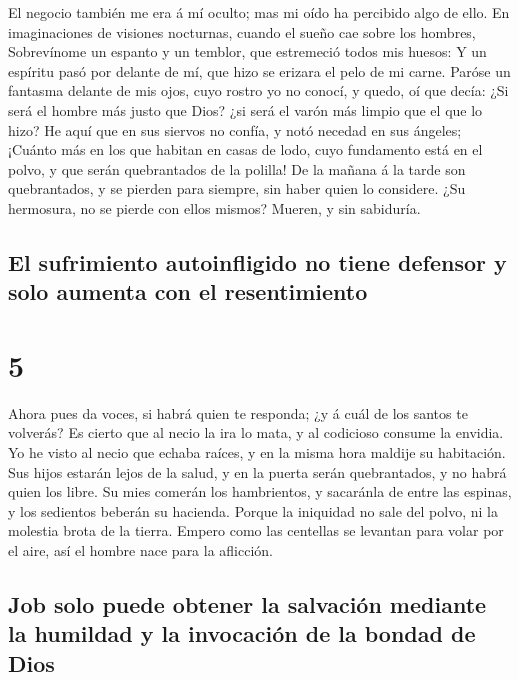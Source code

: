  El negocio también me era á mí oculto; mas mi oído ha
percibido algo de ello.  En imaginaciones de visiones
nocturnas, cuando el sueño cae sobre los hombres, 
Sobrevínome un espanto y un temblor, que estremeció todos mis huesos:
 Y un espíritu pasó por delante de mí, que hizo se
erizara el pelo de mi carne.  Paróse un fantasma delante
de mis ojos, cuyo rostro yo no conocí, y quedo, oí que decía:
 ¿Si será el hombre más justo que Dios? ¿si será el varón
más limpio que el que lo hizo?  He aquí que en sus
siervos no confía, y notó necedad en sus ángeles; 
¡Cuánto más en los que habitan en casas de lodo, cuyo fundamento está en
el polvo, y que serán quebrantados de la polilla!  De la
mañana á la tarde son quebrantados, y se pierden para siempre, sin haber
quien lo considere.  ¿Su hermosura, no se pierde con
ellos mismos? Mueren, y sin sabiduría.

\hypertarget{el-sufrimiento-autoinfligido-no-tiene-defensor-y-solo-aumenta-con-el-resentimiento}{%
\subsection{El sufrimiento autoinfligido no tiene defensor y solo
aumenta con el
resentimiento}\label{el-sufrimiento-autoinfligido-no-tiene-defensor-y-solo-aumenta-con-el-resentimiento}}

\hypertarget{section-18-5}{%
\section{5}\label{section-18-5}}

 Ahora pues da voces, si habrá quien te responda; ¿y á
cuál de los santos te volverás?  Es cierto que al necio la
ira lo mata, y al codicioso consume la envidia.  Yo he
visto al necio que echaba raíces, y en la misma hora maldije su
habitación.  Sus hijos estarán lejos de la salud, y en la
puerta serán quebrantados, y no habrá quien los libre.  Su
mies comerán los hambrientos, y sacaránla de entre las espinas, y los
sedientos beberán su hacienda.  Porque la iniquidad no
sale del polvo, ni la molestia brota de la tierra.  Empero
como las centellas se levantan para volar por el aire, así el hombre
nace para la aflicción.

\hypertarget{job-solo-puede-obtener-la-salvaciuxf3n-mediante-la-humildad-y-la-invocaciuxf3n-de-la-bondad-de-dios}{%
\subsection{Job solo puede obtener la salvación mediante la humildad y
la invocación de la bondad de
Dios}\label{job-solo-puede-obtener-la-salvaciuxf3n-mediante-la-humildad-y-la-invocaciuxf3n-de-la-bondad-de-dios}}

